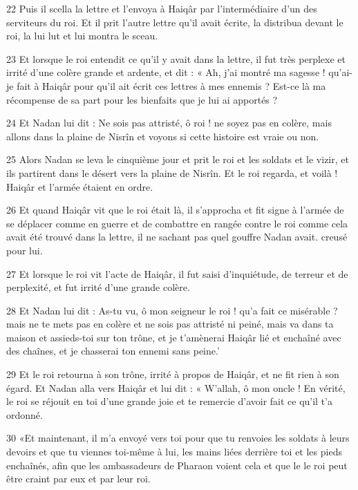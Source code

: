 \par 22 Puis il scella la lettre et l'envoya à Haiqâr par l'intermédiaire d'un des serviteurs du roi. Et il prit l'autre lettre qu'il avait écrite, la distribua devant le roi, la lui lut et lui montra le sceau.

\par 23 Et lorsque le roi entendit ce qu'il y avait dans la lettre, il fut très perplexe et irrité d'une colère grande et ardente, et dit : « Ah, j'ai montré ma sagesse ! qu'ai-je fait à Haiqâr pour qu'il ait écrit ces lettres à mes ennemis ? Est-ce là ma récompense de sa part pour les bienfaits que je lui ai apportés ?

\par 24 Et Nadan lui dit : Ne sois pas attristé, ô roi ! ne soyez pas en colère, mais allons dans la plaine de Nisrîn et voyons si cette histoire est vraie ou non.

\par 25 Alors Nadan se leva le cinquième jour et prit le roi et les soldats et le vizir, et ils partirent dans le désert vers la plaine de Nisrîn. Et le roi regarda, et voilà ! Haiqâr et l’armée étaient en ordre.

\par 26 Et quand Haiqâr vit que le roi était là, il s'approcha et fit signe à l'armée de se déplacer comme en guerre et de combattre en rangée contre le roi comme cela avait été trouvé dans la lettre, il ne sachant pas quel gouffre Nadan avait. creusé pour lui.

\par 27 Et lorsque le roi vit l'acte de Haiqâr, il fut saisi d'inquiétude, de terreur et de perplexité, et fut irrité d'une grande colère.

\par 28 Et Nadan lui dit : As-tu vu, ô mon seigneur le roi ! qu'a fait ce misérable ? mais ne te mets pas en colère et ne sois pas attristé ni peiné, mais va dans ta maison et assieds-toi sur ton trône, et je t'amènerai Haiqâr lié et enchaîné avec des chaînes, et je chasserai ton ennemi sans peine.'

\par 29 Et le roi retourna à son trône, irrité à propos de Haiqâr, et ne fit rien à son égard. Et Nadan alla vers Haiqâr et lui dit : « W'allah, ô mon oncle ! En vérité, le roi se réjouit en toi d'une grande joie et te remercie d'avoir fait ce qu'il t'a ordonné.

\par 30 «Et maintenant, il m'a envoyé vers toi pour que tu renvoies les soldats à leurs devoirs et que tu viennes toi-même à lui, les mains liées derrière toi et les pieds enchaînés, afin que les ambassadeurs de Pharaon voient cela et que le le roi peut être craint par eux et par leur roi.

